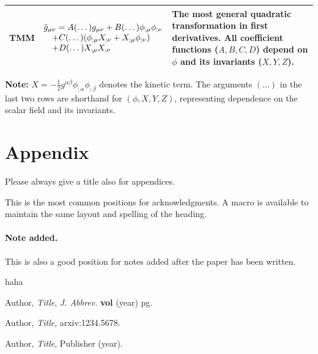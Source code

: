 \documentclass[a4paper,11pt]{article}
\begin{document}
\begin{table}[H]
\begin{tabularx}{\textwidth}{@{} p{4.3cm} p{5.8cm} X @{}}
TMM &
$\begin{array}[t]{@{}l@{}}
\hat{g}_{\mu \nu} = A(\dots) g_{\mu \nu} + B(\dots)\phi_{;\mu}\phi_{;\nu} \\
\quad + C(\dots)(\phi_{;\mu}X_{;\nu}+X_{;\mu}\phi_{;\nu}) \\
\quad + D(\dots)X_{;\mu}X_{;\nu}
\end{array}$ &
The most general quadratic transformation in first derivatives. All coefficient functions ($A, B, C, D$) depend on $\phi$ and its invariants ($X, Y, Z$). \\

\bottomrule
\end{tabularx}

\vspace{1em}
\footnotesize
\textbf{Note:} $X = -\frac{1}{2}g^{\alpha\beta}\phi_{;\alpha}\phi_{;\beta}$ denotes the kinetic term. The arguments $(\dots)$ in the last two rows are shorthand for $(\phi, X, Y, Z)$, representing dependence on the scalar field and its invariants.
\end{table}


\appendix
\section{Appendix} 
Please always give a title also for appendices.








\acknowledgments

This is the most common positions for acknowledgments. A macro is
available to maintain the same layout and spelling of the heading.

\paragraph{Note added.} This is also a good position for notes added
after the paper has been written.


haha




\begin{thebibliography}{99}

Author, \emph{Title}, \emph{J. Abbrev.} {\bf vol} (year) pg.

Author, \emph{Title},
arxiv:1234.5678.

Author, \emph{Title},
Publisher (year).





\end{thebibliography}
\end{document}
